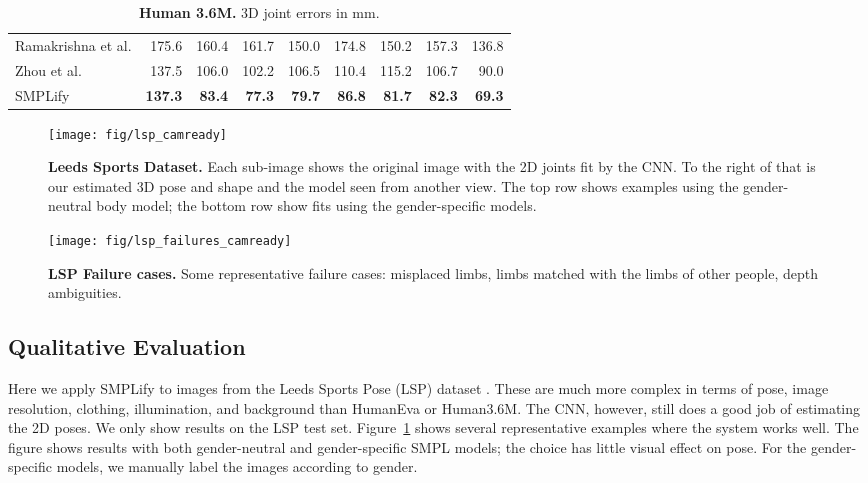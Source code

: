 \documentclass[runningheads]{llncs}
\begin{document}
\begin{table}[t]
{\begin{tabular}{lrrrrrrrrr}
Ramakrishna et al. \cite{Ramakrishna:2012} & 175.6                          & 160.4                          & 161.7                       & 150.0                        & 174.8                       & \multicolumn{2}{r}{150.2}                              & 157.3                         & 136.8                      \\
Zhou et al. \cite{Zhou:2015b} & 137.5                          & 106.0                          & 102.2                       & 106.5                        & 110.4                       & \multicolumn{2}{r}{115.2}                              & 106.7                         & 90.0                       \\
SMPLify                     & \textbf{137.3}                 & \textbf{83.4}                  & \textbf{77.3}               & \textbf{79.7}                & \textbf{86.8}               & \multicolumn{2}{r}{\textbf{81.7}}                      & \textbf{82.3}                 & \textbf{69.3}              \\ \hline
\end{tabular}
}
\caption{{\bf Human 3.6M.} {3D joint errors in mm}.
}
\label{table:H36}
\end{table}

\begin{figure}[t]
\centerline{
\texttt{[image: fig/lsp\_camready]}
}

\caption{{\bf Leeds Sports Dataset.}
Each sub-image shows the original image with the 2D joints fit by the CNN.
To the right of that is our estimated 3D pose and shape and the model seen from another view.
The top row shows examples using the gender-neutral body model; the bottom row show fits using the gender-specific models.}
\label{fig:LSPgood}
\end{figure}
\begin{figure}[b]
\centerline{
\texttt{[image: fig/lsp\_failures\_camready]}
}
\caption{{\bf LSP Failure cases.} Some representative failure
  cases: misplaced limbs, limbs matched with the limbs of other
  people, depth ambiguities.
}
\label{fig:LSPbad}
\end{figure}

\subsection{Qualitative Evaluation}
\label{subsec:qualitative}
Here we apply SMPLify to images from the Leeds Sports Pose (LSP) dataset
\cite{LSP:2010}.
These are much more complex in terms of pose, image resolution,
clothing, illumination, and background than HumanEva or Human3.6M.
The CNN, however, still does a good job of estimating the 2D poses.
We only show results on the LSP test set.
Figure~\ref{fig:LSPgood} shows several representative examples where
the system works well.
The figure shows results with both gender-neutral and gender-specific
SMPL models; the choice has little visual effect on pose.
For the gender-specific models, we manually label the images according
to gender.
\end{document}
